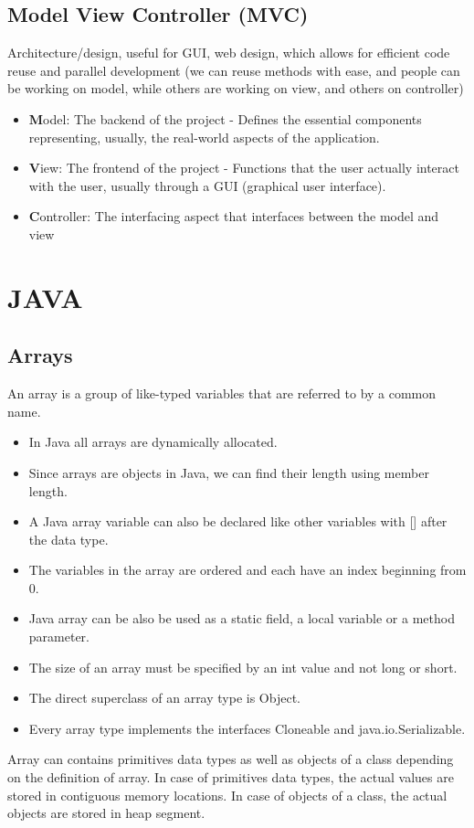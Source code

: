 \documentclass[a4paper, 11pt]{article}
\begin{document}
    \subsection{Model View Controller (MVC)}
        Architecture/design, useful for GUI, web design, which allows for efficient code reuse and parallel development (we can reuse methods with ease, and people can be working on model, while others are working on view, and others on controller)
        \begin{itemize}
            \item \textbf{M}odel: The backend of the project - Defines the essential components representing, usually, the real-world aspects of the application.
            \item \textbf{V}iew: The frontend of the project - Functions that the user actually interact with the user, usually through a GUI (graphical user interface).
            \item \textbf{C}ontroller: The interfacing aspect that interfaces between the model and view
        \end{itemize}

\newpage

\section{JAVA}

    \subsection{Arrays}
        An array is a group of like-typed variables that are referred to by a common name.
        \begin{itemize}
            \item In Java all arrays are dynamically allocated.
            \item Since arrays are objects in Java, we can find their length using member length.
            \item A Java array variable can also be declared like other variables with [] after the data type.
            \item The variables in the array are ordered and each have an index beginning from 0.
            \item Java array can be also be used as a static field, a local variable or a method parameter.
            \item The size of an array must be specified by an int value and not long or short.
            \item The direct superclass of an array type is Object.
            \item Every array type implements the interfaces Cloneable and java.io.Serializable.
        \end{itemize}
        Array can contains primitives data types as well as objects of a class depending on the definition of array. In case of primitives data types, the actual values are stored in contiguous memory locations. In case of objects of a class, the actual objects are stored in heap segment.
\end{document}
